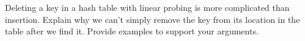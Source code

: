 Deleting a key in a hash table with linear probing is more complicated
than insertion.  Explain why we can't simply remove the key from its
location in the table after we find it.  Provide examples to support
your arguments.
